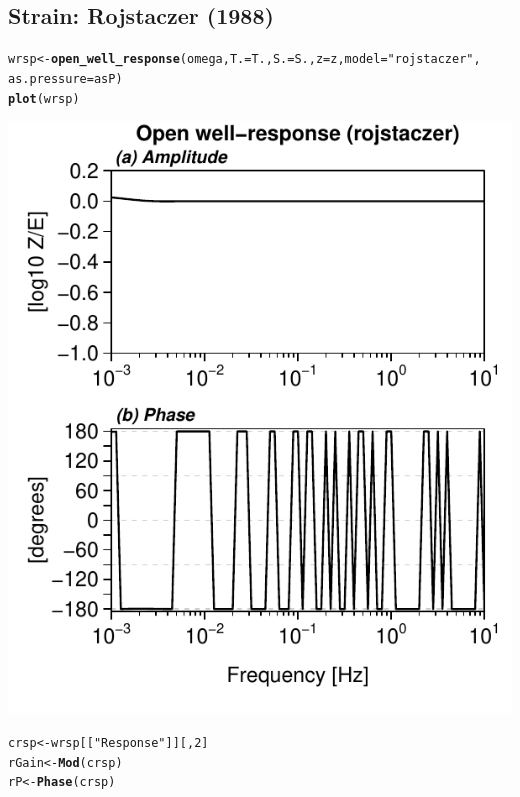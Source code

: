 \documentclass[12pt]{article}\usepackage[]{graphicx}\usepackage[]{color}
\makeatletter
\def\maxwidth{ %
  \ifdim\Gin@nat@width>\linewidth
    \linewidth
  \else
    \Gin@nat@width
  \fi
}
\newcommand{\hlnum}[1]{\textcolor[rgb]{0.686,0.059,0.569}{#1}}%
\newcommand{\hlstr}[1]{\textcolor[rgb]{0.192,0.494,0.8}{#1}}%
\newcommand{\hlstd}[1]{\textcolor[rgb]{0.345,0.345,0.345}{#1}}%
\newcommand{\hlkwb}[1]{\textcolor[rgb]{0.69,0.353,0.396}{#1}}%
\newcommand{\hlkwc}[1]{\textcolor[rgb]{0.333,0.667,0.333}{#1}}%
\newcommand{\hlkwd}[1]{\textcolor[rgb]{0.737,0.353,0.396}{\textbf{#1}}}%
\newenvironment{kframe}{%
 \def\at@end@of@kframe{}%
 \ifinner\ifhmode%
  \def\at@end@of@kframe{\end{minipage}}%
  \begin{minipage}{\columnwidth}%
 \fi\fi%
 \def\FrameCommand##1{\hskip\@totalleftmargin \hskip-\fboxsep
 \colorbox{shadecolor}{##1}\hskip-\fboxsep
     \hskip-\linewidth \hskip-\@totalleftmargin \hskip\columnwidth}%
 \MakeFramed {\advance\hsize-\width
   \@totalleftmargin\z@ \linewidth\hsize
   \@setminipage}}%
 {\par\unskip\endMakeFramed%
 \at@end@of@kframe}
\newenvironment{knitrout}{}{} %
\makeatother
\begin{document}
\clearpage
\subsection{Strain: Rojstaczer (1988)}

\begin{knitrout}\small
{}\color{fgcolor}\begin{kframe}
\begin{alltt}
\hlstd{wrsp} \hlkwb{<-} \hlkwd{open_well_response}\hlstd{(omega,} \hlkwc{T.} \hlstd{= T.,} \hlkwc{S.} \hlstd{= S.,} \hlkwc{z} \hlstd{= z,} \hlkwc{model} \hlstd{=} \hlstr{"rojstaczer"}\hlstd{,}
    \hlkwc{as.pressure} \hlstd{= asP)}
\hlkwd{plot}\hlstd{(wrsp)}
\end{alltt}
\end{kframe}
\includegraphics[width=\maxwidth]{figure/ROJRESP-1} 
\begin{kframe}\begin{alltt}
\hlstd{crsp} \hlkwb{<-} \hlstd{wrsp[[}\hlstr{"Response"}\hlstd{]][,} \hlnum{2}\hlstd{]}
\hlstd{rGain} \hlkwb{<-} \hlkwd{Mod}\hlstd{(crsp)}
\hlstd{rP} \hlkwb{<-} \hlkwd{Phase}\hlstd{(crsp)}
\end{alltt}
\end{kframe}
\end{knitrout}
\end{document}
